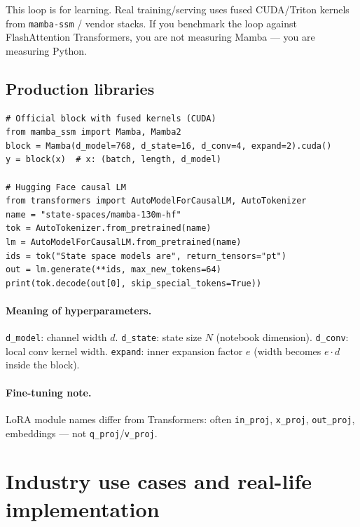 \documentclass[11pt,a4paper]{article}
\begin{document}
\begin{notebox}
This loop is for learning.
Real training/serving uses fused CUDA/Triton kernels from \texttt{mamba-ssm} / vendor stacks.
If you benchmark the loop against FlashAttention Transformers, you are not measuring Mamba --- you are measuring Python.
\end{notebox}

\subsection{Production libraries}

\begin{lstlisting}
# Official block with fused kernels (CUDA)
from mamba_ssm import Mamba, Mamba2
block = Mamba(d_model=768, d_state=16, d_conv=4, expand=2).cuda()
y = block(x)  # x: (batch, length, d_model)

# Hugging Face causal LM
from transformers import AutoModelForCausalLM, AutoTokenizer
name = "state-spaces/mamba-130m-hf"
tok = AutoTokenizer.from_pretrained(name)
lm = AutoModelForCausalLM.from_pretrained(name)
ids = tok("State space models are", return_tensors="pt")
out = lm.generate(**ids, max_new_tokens=64)
print(tok.decode(out[0], skip_special_tokens=True))
\end{lstlisting}

\paragraph{Meaning of hyperparameters.}
\texttt{d\_model}: channel width $d$.
\texttt{d\_state}: state size $N$ (notebook dimension).
\texttt{d\_conv}: local conv kernel width.
\texttt{expand}: inner expansion factor $e$ (width becomes $e\cdot d$ inside the block).

\paragraph{Fine-tuning note.}
LoRA module names differ from Transformers: often \texttt{in\_proj}, \texttt{x\_proj}, \texttt{out\_proj}, embeddings --- not \texttt{q\_proj}/\texttt{v\_proj}.

\section{Industry use cases and real-life implementation}
\end{document}
